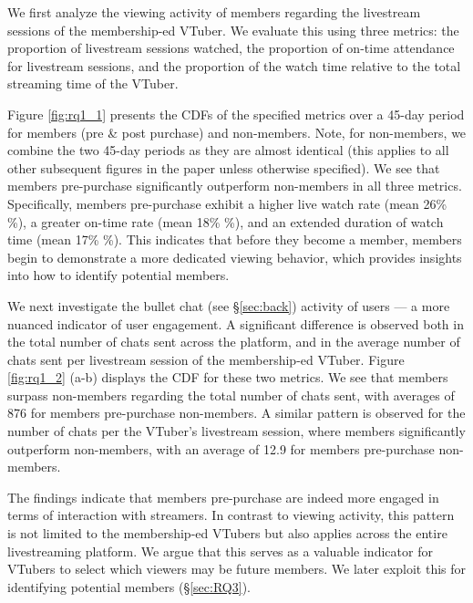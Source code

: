 We first analyze the viewing activity of members regarding the livestream sessions of the membership-ed VTuber.
We evaluate this using three metrics:
\one the proportion of livestream sessions watched, \two the proportion of on-time attendance for livestream sessions, 
and
\three the proportion of the watch time relative to the total streaming time of the VTuber.  

Figure \ref{fig:rq1_1} presents the CDFs of the specified metrics over a 45-day period for members (pre \& post purchase) and non-members. Note, for non-members, we combine the two 45-day periods as they are almost identical (this applies to all other subsequent figures in the paper unless otherwise specified).
We see that members pre-purchase significantly outperform non-members in all three metrics.
Specifically, members pre-purchase exhibit a higher live watch rate (mean 26\% \%), a greater on-time rate (mean 18\% \%), and an extended duration of watch time (mean 17\% \%). This indicates that before they become a member, members begin to demonstrate a more dedicated viewing behavior, which provides insights into how to identify potential members.











We next investigate the bullet chat (see \S\ref{sec:back}) activity of users --- a more nuanced indicator of user engagement. A significant difference is observed both in the total number of chats sent across the platform, and in the average number of chats sent per livestream session of the membership-ed VTuber.
% 
Figure \ref{fig:rq1_2} (a-b) displays the CDF for these two metrics. We see that members surpass non-members regarding the total number of chats sent, with averages of 876 for members pre-purchase  non-members. A similar pattern is observed for the number of chats per the VTuber's livestream session, where members significantly outperform non-members, with an average of 12.9 for members pre-purchase  non-members.

The findings indicate that members pre-purchase are indeed more engaged in terms of interaction with streamers. In contrast to viewing activity, this pattern is not limited to the membership-ed VTubers but also applies across the entire livestreaming platform. We argue that this serves as a valuable indicator for VTubers to select which viewers may be future members. We later exploit this for identifying potential members (\S\ref{sec:RQ3}).

